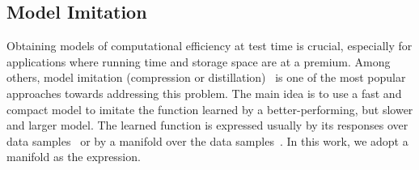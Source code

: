 \documentclass{bmvc2k}
\def\ie{\emph{i.e}\bmvaOneDot}
\def\etal{\emph{et al}\bmvaOneDot}
\begin{document}
\subsection{Model Imitation} 
Obtaining models of computational efficiency at test time is crucial,
especially for applications where running time and storage space are
at a premium. Among others, model imitation (compression or
distillation)~\cite{model:compression,dai:metric:imitation,hinton2015distilling}
is one of the most popular approaches towards addressing this problem.
The main idea is to use a fast and compact model to imitate the
function learned by a better-performing, but slower and larger model.
The learned function is expressed usually by its responses over data
samples~\cite{model:compression,hinton2015distilling} or by a manifold
over the data samples~\cite{dai:metric:imitation}.  In this work, we
adopt a manifold as the expression. 





\end{document}
